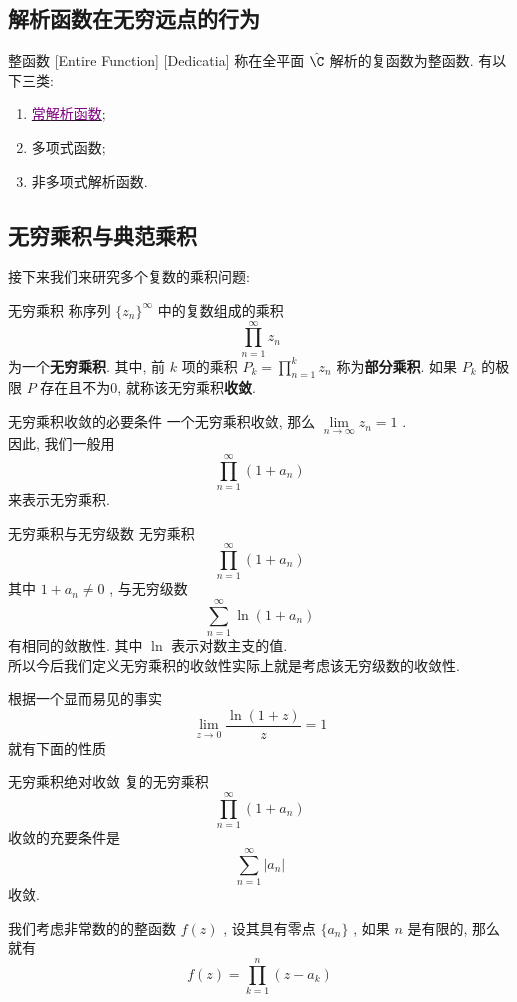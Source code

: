 \documentclass[UTF8]{ctexart}
\newcommand{\hyperrefc}[2]{\hyperref[#1]{\textcolor{purple}{#2}}}
\begin{document}
\subsection{解析函数在无穷远点的行为}
\begin{dfn}
    [EntireFunction]
    {整函数}
    [Entire Function]
    [Dedicatia]
    称在全平面 \( \hat{\C} \) 解析的复函数为整函数. 有以下三类: 
    \begin{enumerate}
        \item \hyperrefc{ppt:TrivialAnalyticalFunction}{常解析函数}; 
        \item 多项式函数; 
        \item 非多项式解析函数. 
    \end{enumerate}
\end{dfn}
\subsection{无穷乘积与典范乘积}
接下来我们来研究多个复数的乘积问题: 
\begin{dfn}
    {无穷乘积}
    称序列 \( \{z_n\}^\infty \) 中的复数组成的乘积
    \[\prod_{n=1}^{\infty}z_n\]
    为一个\textbf{无穷乘积}. 其中, 前 \( k \) 项的乘积 \( P_k=\prod\limits_{n=1}^{k}z_n \) 称为\textbf{部分乘积}. 如果 \( P_k \) 的极限 \( P \) 存在且不为0, 就称该无穷乘积\textbf{收敛}. 
\end{dfn}
\begin{ppt}
    {无穷乘积收敛的必要条件}
    一个无穷乘积收敛, 那么 \( \lim\limits_{n\to\infty}z_n=1 \) .\\
    因此, 我们一般用
    \[\prod_{n=1}^{\infty}(1+a_n)\]
    来表示无穷乘积. 
\end{ppt}
\begin{ppt}
    {无穷乘积与无穷级数}
    无穷乘积
    \[\prod_{n=1}^{\infty}(1+a_n)\]
    其中 \( 1+a_n\neq 0 \) , 与无穷级数
    \[\sum_{n=1}^\infty\ln(1+a_n)\]
    有相同的敛散性. 其中 \( \ln \) 表示对数主支的值. \\
    所以今后我们定义无穷乘积的收敛性实际上就是考虑该无穷级数的收敛性. 
\end{ppt}
根据一个显而易见的事实
\[\lim_{z\to 0}\frac{\ln(1+z)}{z}=1\]
就有下面的性质
\begin{ppt}
    {无穷乘积绝对收敛}
    复的无穷乘积
    \[\prod_{n=1}^{\infty}(1+a_n)\]
    收敛的充要条件是
    \[\sum_{n=1}^\infty|a_n|\]
    收敛. 
\end{ppt}
我们考虑非常数的的整函数 \( f(z) \) , 设其具有零点 \( \{a_n\} \) , 如果 \( n \) 是有限的, 那么就有
\[f(z)=\prod_{k=1}^{n}(z-a_k)\]
\end{document}
